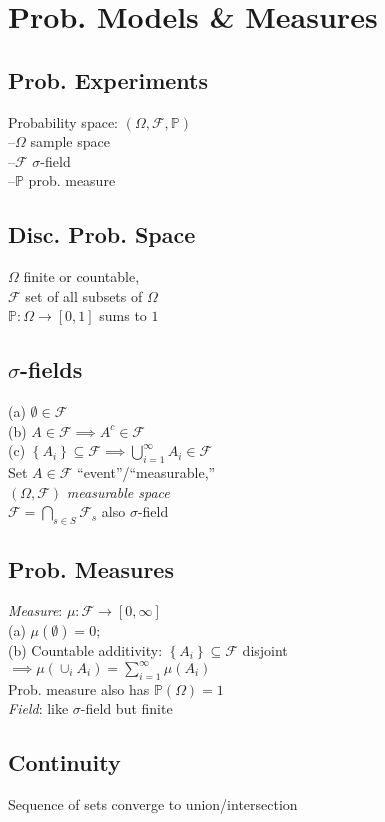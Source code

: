 \section{Prob. Models \& Measures}

	\subsection*{Prob. Experiments}
	Probability space: $\left(\Omega, \mathcal{F}, \mathbb{P}\right)$\\
	--$\Omega$ sample space\\
	--$\mathcal{F}$ $\sigma$-field\\
	--$\mathbb{P}$ prob. measure
	
	\subsection*{Disc. Prob. Space}
	$\Omega$ finite or countable,\\
	$\mathcal{F}$ set of all subsets of $\Omega$\\
	$\mathbb{P}: \Omega\to\left[0, 1\right]$ sums to $1$
	
	\subsection*{$\sigma$-fields}
	(a) $\emptyset\in\mathcal{F}$\\
	(b) $A\in\mathcal{F}\implies A^{c}\in\mathcal{F}$\\
	(c) $\left\{A_{i}\right\}\subseteq\mathcal{F}\implies\bigcup_{i=1}^{\infty}A_{i}\in\mathcal{F}$\\
	Set $A\in\mathcal{F}$ ``event''/``measurable,''\\
	$\left(\Omega, \mathcal{F}\right)$ \emph{measurable space}\\
	$\mathcal{F} = \bigcap_{s\in S}\mathcal{F}_{s}$ also $\sigma$-field
	
	\subsection*{Prob. Measures}
	\emph{Measure}: $\mu: \mathcal{F}\to\left[0, \infty\right]$\\
	(a) $\mu\left(\emptyset\right) = 0$;\\
	(b) Countable additivity: $\left\{A_{i}\right\}\subseteq\mathcal{F}$ disjoint\\
	$\implies\mu\left(\cup_{i}A_{i}\right) = \sum_{i = 1}^{\infty}\mu\left(A_{i}\right)$\\
	Prob. measure also has $\mathbb{P}\left(\Omega\right) = 1$\\
	\emph{Field}: like $\sigma$-field but finite
	
	\subsection*{Continuity}
	Sequence of sets converge to union/intersection
	